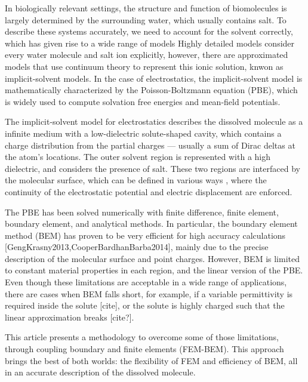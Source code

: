 In biologically relevant settings, the structure and function of biomolecules is largely determined by the surrounding water, which usually contains salt. 
To describe these systems accurately, we need to account for the solvent correctly, which has given rise to a wide range of models \cite{onufriev2018water}
Highly detailed models consider every water molecule and salt ion explicitly, however, there are approximated models that use continuum theory to represent this ionic solution, knwon as implicit-solvent models\cite{RouxSimonson1999,DecherchiETal2015}.
In the case of electrostatics, the implicit-solvent model is mathematically characterized by the Poisson-Boltzmann equation (PBE)\cite{Baker2004,Bardhan2012}, which is widely used to compute solvation free energies and mean-field potentials.

The implicit-solvent model for electrostatics describes the dissolved molecule as a infinite medium with a low-dielectric solute-shaped cavity, which contains a charge distribution from the partial charges --- usually a sum of Dirac deltas at the atom's locations.
The outer solvent region is represented with a high dielectric, and considers the presence of salt.
These two regions are interfaced by the molecular surface, which can be defined in various ways \cite{HarrisBoschitcshFenley2013}, where the continuity of the electrostatic potential and electric displacement are enforced.

The PBE has been solved numerically with finite difference\cite{BakerETal2001,GilsonETal1985,JurrusETal2018,LiETal2019}, finite element\cite{HolstETal2012,BondEtal2010}, boundary element\cite{AltmanBardhanWhiteTidor09,LuETal2006,GengKrasny2013,CooperBardhanBarba2014}, and analytical\cite{YapHeadgordon2010,FelbergETal2017} methods.
In particular, the boundary element method (BEM) has proven to be very efficient for high accuracy calculations [GengKrasny2013,CooperBardhanBarba2014], mainly due to the precise description of the molecular surface and point charges. 
However, BEM is limited to constant material properties in each region, and the linear version of the PBE. 
Even though these limitations are acceptable in a wide range of applications, there are cases when BEM falls short, for example, if a variable permittivity is required inside the solute [cite], or the solute is highly charged such that the linear approximation breaks [cite?].

This article presents a methodology to overcome some of those limitations, through coupling boundary and finite elements (FEM-BEM).
This approach brings the best of both worlds: the flexibility of FEM and efficiency of BEM, all in an accurate description of the dissolved molecule.
